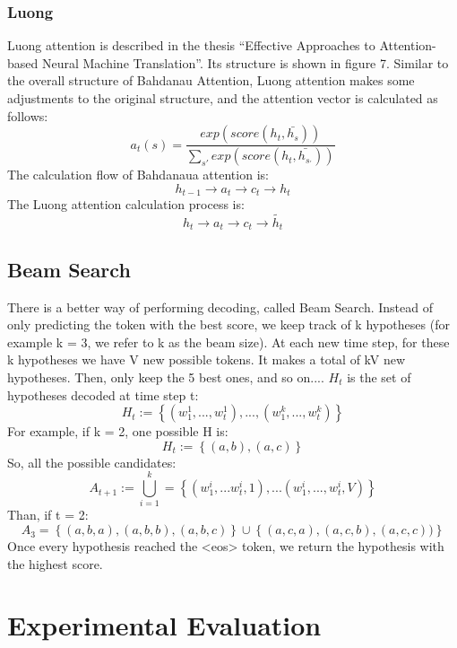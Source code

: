 \documentclass[sigconf]{acmart}
\begin{document}
\subsubsection{Luong}
Luong attention is described in the thesis “Effective Approaches to Attention-based Neural Machine Translation”. Its structure is shown in figure 7. Similar to the overall structure of Bahdanau Attention, Luong attention makes some adjustments to the original structure, and the attention vector is calculated as follows:
$$a_t(s) = \frac{exp(score(h_t,\bar{h_s}))}{\sum_{s'}^{}exp(score(h_t,\bar{h_s_'}))}$$
The calculation flow of Bahdanaua attention is:
$$h_{t-1} \rightarrow a_t\rightarrow c_t\rightarrow h_t$$
The Luong attention calculation process is:
$$h_t \rightarrow a_t\rightarrow c_t\rightarrow \widetilde{h_t}$$

\subsection{Beam Search}
There is a better way of performing decoding, called Beam Search. Instead of only predicting the token with the best score, we keep track of k hypotheses (for example k = 3, we refer to k as the beam size). At each new time step, for these k hypotheses we have V new possible tokens. It makes a total of kV new hypotheses. Then, only keep the 5 best ones, and so on.... 
$H_t$ is the set of hypotheses decoded at time step t:
$$H_t := \left \{ (w_1^1,...,w_t^1),...,(w_1^k,...,w_t^k) \right \}$$
For example, if k = 2, one possible H is:
$$H_t := \left \{ (a,b),(a,c) \right \}$$
So, all the possible candidates:
$$A_{t+1} := \bigcup_{i=1}^{k} = \left \{(w_1^i,...w_t^i,1),...(w_1^i,...,w_t^i,V) \right \}$$
Than, if t = 2:
$$A_3 = \left \{  (a,b,a),(a,b,b),(a,b,c)\right \}\cup \left \{ (a,c,a),(a,c,b),(a,c,c)) \right \}$$
Once every hypothesis reached the <eos> token, we return the hypothesis with the highest score.
\section{Experimental Evaluation}




\end{document}
